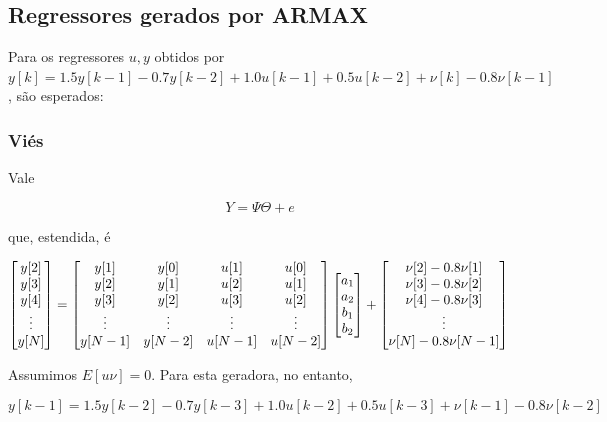 \documentclass{article}
\begin{document}
\subsection*{Regressores gerados por ARMAX}

Para os regressores $u, y$ obtidos por $y[k] = 1.5y[k-1] - 0.7y[k-2] + 1.0u[k-1] + 0.5u[k-2] + \nu[k] - 0.8\nu[k-1]$, são esperados:

\subsubsection*{Viés}

Vale

\begin{equation*}
Y = \Psi\Theta + e
\end{equation*}

que, estendida, é

\begin{equation*}
\begin{bmatrix}
y[2] \\
y[3] \\
y[4] \\
\vdots \\
y[N]
\end{bmatrix} =
\begin{bmatrix}
y[1] & y[0] & u[1] & u[0] \\
y[2] & y[1] & u[2] & u[1] \\
y[3] & y[2] & u[3] & u[2] \\
\vdots & \vdots & \vdots & \vdots \\
y[N-1] & y[N-2] & u[N-1] & u[N-2]
\end{bmatrix}
\begin{bmatrix}
a_1 \\
a_2 \\
b_1 \\
b_2
\end{bmatrix} +
\begin{bmatrix}
\nu[2] - 0.8\nu[1] \\
\nu[3] - 0.8\nu[2] \\
\nu[4] - 0.8\nu[3] \\
\vdots \\
\nu[N] - 0.8\nu[N-1]
\end{bmatrix} \\
\end{equation*}

Assumimos $E[u\nu] = 0$. Para esta geradora, no entanto,

\begin{equation*}
y[k - 1] = 1.5y[k - 2] - 0.7y[k - 3] + 1.0u[k - 2] + 0.5u[k - 3] + \nu[k - 1] - 0.8\nu[k - 2]
\end{equation*}
\end{document}
